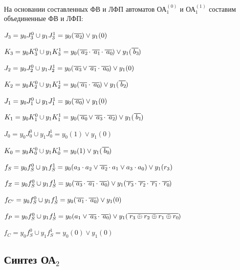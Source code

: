 На основании составленных ФВ и ЛФП автоматов ОА$^{(0)}_{1}$ и ОА$^{(1)}_{1}$ составим объединенные ФВ и ЛФП:

$J_3 = y_0 J^0_3 \cup y_1 J^1_3 = y_0 (\oline{a_2}) \vee y_1(0)$

$K_3 = y_0 K^0_3 \cup y_1 K^1_3 = y_0 (\oline{a_2} \cdot \oline{a_1} \cdot \oline{a_0}) \vee y_1(\oline{b_3})$

$J_2 = y_0 J^0_2 \cup y_1 J^1_2 = y_0 (\oline{a_3} \vee \oline{a_1} \cdot \oline{a_0}) \vee y_1(0)$

$K_2 = y_0 K^0_2 \cup y_1 K^1_2 = y_0 (\oline{a_1} \cdot \oline{a_0}) \vee y_1(\oline{b_2})$

$J_1 = y_0 J^0_1 \cup y_1 J^1_1 = y_0 (\oline{a_0}) \vee y_1(0)$

$K_1 = y_0 K^0_1 \cup y_1 K^1_1 = y_0 (\oline{a_0} \vee \oline{a_3} \cdot \oline{a_2}) \vee y_1(\oline{b_1})$

$J_0 = y_0 J^0_0 \cup y_1 J^1_0 = y_0 (1) \vee y_1(0)$

$K_0 = y_0 K^0_0 \cup y_1 K^1_0 = y_0 (1) \vee y_1(\oline{b_0})$

$f_S = y_0 f^0_S \cup y_1 f^1_S = y_0 (a_3 \cdot a_2 \vee \oline{a_2} \cdot a_1 \vee a_3 \cdot a_0) \vee y_1 (r_3)$

$f_Z = y_0 f^0_S \cup y_1 f^1_S = y_0 (\oline{a_3} \cdot \oline{a_1} \cdot \oline{a_0}) \vee y_1 (\oline{r_3} \cdot \oline{r_2} \cdot \oline{r_1} \cdot \oline{r_0})$

$f_{C'} = y_0 f^0_S \cup y_1 f^1_S = y_0 (\oline{a_1} \cdot \oline{a_0}) \vee y_1 (0)$

$f_P = y_0 f^0_S \cup y_1 f^1_S = y_0 (a_1 \vee \oline{a_3} \cdot \oline{a_0}) \vee y_1 (\oline{r_3 \oplus r_2 \oplus r_1 \oplus r_0})$

$f_C = y_0 f^0_S \cup y_1 f^1_S = y_0 (0) \vee y_1 (0)$



\clearpage
\subsection{Синтез ОА${}_2$}






















